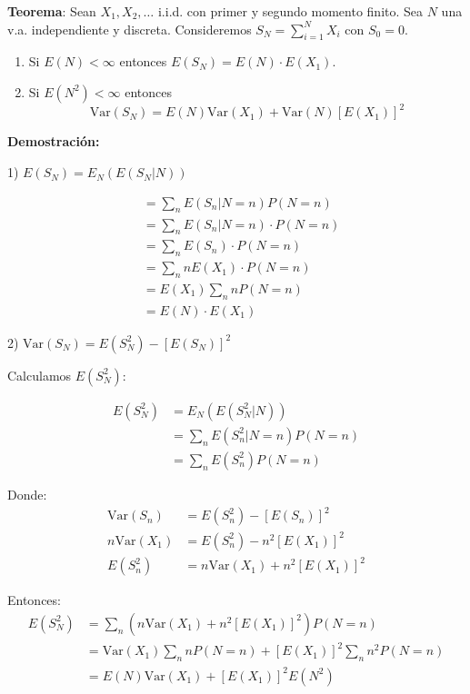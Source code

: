 \documentclass[12pt,a4paper]{article}
\newcommand{\teorema}[1]{%
\begin{teoremabox}
\textbf{Teorema}: #1
\end{teoremabox}
}
\begin{document}
\teorema{Sean $X_1, X_2, \ldots$ i.i.d. con primer y segundo momento finito. Sea $N$ una v.a. independiente y discreta. Consideremos $S_N = \sum_{i=1}^{N} X_i$ con $S_0 = 0$.
\begin{enumerate}
\item Si $E(N) < \infty$ entonces $E(S_N) = E(N) \cdot E(X_1)$.
\item Si $E(N^2) < \infty$ entonces 
\begin{equation*}
\text{Var}(S_N) = E(N) \text{Var}(X_1) + \text{Var}(N) [E(X_1)]^2
\end{equation*}
\end{enumerate}}

\textbf{Demostración:}

1) $E(S_N) = E_N(E(S_N|N))$

\begin{align*}
&= \sum_n E(S_n|N=n) P(N=n) \\
&= \sum_n E(S_n|N=n) \cdot P(N=n) \\
&= \sum_n E(S_n) \cdot P(N=n) \\
&= \sum_n n E(X_1) \cdot P(N=n) \\
&= E(X_1) \sum_n n P(N=n) \\
&= E(N) \cdot E(X_1)
\end{align*}

2) $\text{Var}(S_N) = E(S_N^2) - [E(S_N)]^2$

Calculamos $E(S_N^2)$:

\begin{align*}
E(S_N^2) &= E_N(E(S_N^2|N)) \\
&= \sum_n E(S_n^2|N=n) P(N=n) \\
&= \sum_n E(S_n^2) P(N=n)
\end{align*}

Donde:
\begin{align*}
\text{Var}(S_n) &= E(S_n^2) - [E(S_n)]^2 \\
n\text{Var}(X_1) &= E(S_n^2) - n^2[E(X_1)]^2 \\
E(S_n^2) &= n\text{Var}(X_1) + n^2[E(X_1)]^2
\end{align*}

Entonces:
\begin{align*}
E(S_N^2) &= \sum_n \left(n\text{Var}(X_1) + n^2[E(X_1)]^2\right) P(N=n) \\
&= \text{Var}(X_1) \sum_n n P(N=n) + [E(X_1)]^2 \sum_n n^2 P(N=n) \\
&= E(N)\text{Var}(X_1) + [E(X_1)]^2 E(N^2)
\end{align*}
\end{document}

